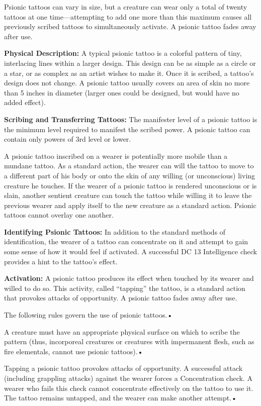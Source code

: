 \documentclass{article}
\begin{document}
Psionic tattoos can vary in size, but a creature can wear only a total of twenty 
tattoos at one time---attempting to add one more than this maximum causes all previously 
scribed tattoos to simultaneously activate. A psionic tattoo fades away after use.

\textbf{Physical Description:} A typical psionic tattoo is a colorful pattern of 
tiny, interlacing lines within a larger design. This design can be as simple as 
a circle or a star, or as complex as an artist wishes to make it. Once it is scribed, 
a tattoo's design does not change. A psionic tattoo usually covers an area of skin 
no more than 5 inches in diameter (larger ones could be designed, but would have 
no added effect).

\textbf{Scribing and Transferring Tattoos:} The manifester level of a psionic tattoo 
is the minimum level required to manifest the scribed power. A psionic tattoo can 
contain only powers of 3rd level or lower.

A psionic tattoo inscribed on a wearer is potentially more mobile than a mundane 
tattoo. As a standard action, the wearer can will the tattoo to move to a different 
part of his body or onto the skin of any willing (or unconscious) living creature 
he touches. If the wearer of a psionic tattoo is rendered unconscious or is slain, 
another sentient creature can touch the tattoo while willing it to leave the previous 
wearer and apply itself to the new creature as a standard action. Psionic tattoos 
cannot overlay one another.

\textbf{Identifying Psionic Tattoos: }In addition to the standard methods of identification, 
the wearer of a tattoo can concentrate on it and attempt to gain some sense of 
how it would feel if activated. A successful DC 13 Intelligence check provides 
a hint to the tattoo's effect. 

\textbf{Activation: }A psionic tattoo produces its effect when touched by its wearer 
and willed to do so. This activity, called ``tapping'' the tattoo, is a standard 
action that provokes attacks of opportunity. A psionic tattoo fades away after 
use.

The following rules govern the use of psionic tattoos.• 

\parindent=3pt
A creature must have an appropriate physical surface on which to scribe the pattern 
(thus, incorporeal creatures or creatures with impermanent flesh, such as fire 
elementals, cannot use psionic tattoos).• 

Tapping a psionic tattoo provokes attacks of opportunity. A successful attack (including 
grappling attacks) against the wearer forces a Concentration check. A wearer who 
fails this check cannot concentrate effectively on the tattoo to use it. The tattoo 
remains untapped, and the wearer can make another attempt.• 
\end{document}
